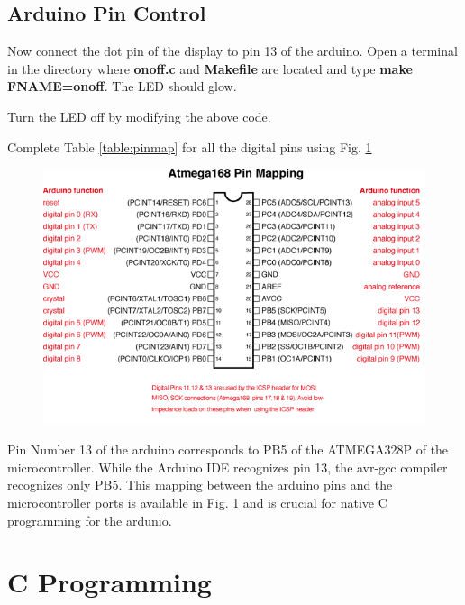 \documentclass[journal,12pt,twocolumn]{IEEEtran}
\begin{document}
\subsection{Arduino Pin Control}
\begin{problem}
Now connect the dot pin of the display to pin 13 of the arduino.  Open a terminal in the directory where \textbf{onoff.c} and \textbf{Makefile} are located and type \textbf{make FNAME=onoff}.  The LED should glow.
\end{problem}
%
\begin{problem}
Turn the LED off by modifying the above code.
\end{problem}
%
\begin{problem}
Complete   Table \ref{table:pinmap} for all the digital pins using Fig. \ref{fig:Atmega168PinMap2}
\end{problem}
%

\begin{figure}[!h]
\begin{center}
\includegraphics[width=\columnwidth]{./figs/Atmega168PinMap2}
\end{center}
\caption{}
\label{fig:Atmega168PinMap2}
\end{figure}
%
Pin Number 13 of the arduino corresponds to PB5 of the ATMEGA328P of the microcontroller.  While the Arduino IDE recognizes pin 13, the avr-gcc compiler recognizes only PB5.  This mapping between the arduino pins and the microcontroller ports is available in Fig. \ref{fig:Atmega168PinMap2} and is crucial for native C programming for the ardunio.
%
\section{C Programming}
%
\end{document}
